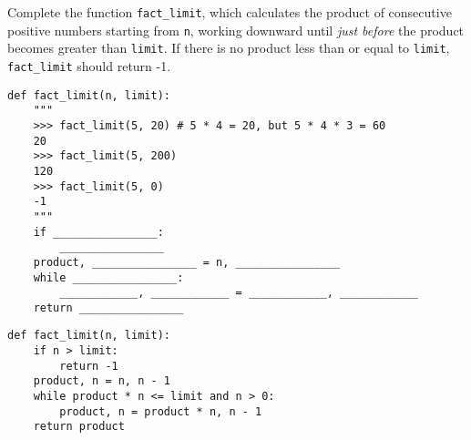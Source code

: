 \question Complete the function \lstinline{fact_limit}, which calculates the product of consecutive positive numbers starting from \lstinline{n}, working downward until \textit{just before} the product becomes greater than \lstinline{limit}. If there is no product less than or equal to \lstinline{limit}, \lstinline{fact_limit} should return -1.

\begin{blocksection}
\begin{lstlisting}
def fact_limit(n, limit):
    """
    >>> fact_limit(5, 20) # 5 * 4 = 20, but 5 * 4 * 3 = 60
    20
    >>> fact_limit(5, 200)
    120
    >>> fact_limit(5, 0)
    -1
    """
    if ________________:
        ________________
    product, ________________ = n, ________________
    while ________________:
        ____________, ____________ = ____________, ____________
    return ________________

\end{lstlisting}
\end{blocksection}

\begin{blocksection}
\begin{solution}
\begin{lstlisting}
def fact_limit(n, limit):
    if n > limit:
        return -1
    product, n = n, n - 1
    while product * n <= limit and n > 0:
        product, n = product * n, n - 1
    return product
\end{lstlisting}
\end{solution}
\end{blocksection}